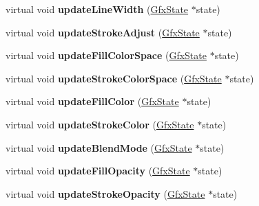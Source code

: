 \begin{DoxyCompactItemize}
\item 
\mbox{\label{class_splash_output_dev_add65a8eeba7ed482f32ae13a2b8bbff7}} 
virtual void {\bfseries update\+Line\+Width} (\hyperlink{class_gfx_state}{Gfx\+State} $\ast$state)
\item 
\mbox{\label{class_splash_output_dev_ad318eaa81c9fb070e9083756aedbe3fa}} 
virtual void {\bfseries update\+Stroke\+Adjust} (\hyperlink{class_gfx_state}{Gfx\+State} $\ast$state)
\item 
\mbox{\label{class_splash_output_dev_aeae866c00316da78f0d66fb349335758}} 
virtual void {\bfseries update\+Fill\+Color\+Space} (\hyperlink{class_gfx_state}{Gfx\+State} $\ast$state)
\item 
\mbox{\label{class_splash_output_dev_a9d049536916af0fbca34f86de8769cc1}} 
virtual void {\bfseries update\+Stroke\+Color\+Space} (\hyperlink{class_gfx_state}{Gfx\+State} $\ast$state)
\item 
\mbox{\label{class_splash_output_dev_a1bd34e8e4176060b6751072330215464}} 
virtual void {\bfseries update\+Fill\+Color} (\hyperlink{class_gfx_state}{Gfx\+State} $\ast$state)
\item 
\mbox{\label{class_splash_output_dev_a16be5674bb70e0b9043174abab3e920e}} 
virtual void {\bfseries update\+Stroke\+Color} (\hyperlink{class_gfx_state}{Gfx\+State} $\ast$state)
\item 
\mbox{\label{class_splash_output_dev_a8a043be24cad9800a05d2747b51701c7}} 
virtual void {\bfseries update\+Blend\+Mode} (\hyperlink{class_gfx_state}{Gfx\+State} $\ast$state)
\item 
\mbox{\label{class_splash_output_dev_a70fd964b5b428f78a9b9d378d05382a2}} 
virtual void {\bfseries update\+Fill\+Opacity} (\hyperlink{class_gfx_state}{Gfx\+State} $\ast$state)
\item 
\mbox{\label{class_splash_output_dev_a94960bf5aaac12834042256e29a09183}} 
virtual void {\bfseries update\+Stroke\+Opacity} (\hyperlink{class_gfx_state}{Gfx\+State} $\ast$state)

\end{DoxyCompactItemize}

